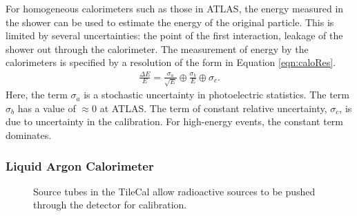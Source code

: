 For homogeneous calorimeters such as those in ATLAS, the energy measured in the shower can be used to estimate the energy of the original particle.
This is limited by several uncertainties: the point of the first interaction, leakage of the shower out through the calorimeter.
The measurement of energy by the calorimeters is specified by a resolution of the form in Equation \ref{eqn:caloRes}.
\begin{equation}\begin{split}\label{eqn:caloRes}
    \frac{\Delta E}{E}=\frac{\sigma_a}{\sqrt{E}}\oplus\frac{\sigma_b}{E}\oplus\sigma_c.
\end{split}\end{equation}
Here, the term $\sigma_a$ is a stochastic uncertainty in photoelectric statistics.
The term $\sigma_b$ has a value of $\approx0$ at ATLAS.
The term of constant relative uncertainty, $\sigma_c$, is due to uncertainty in the calibration.
For high-energy events, the constant term dominates.

\subsubsection{Liquid Argon Calorimeter}

\begin{figure}[h!]
\captionsetup[subfigure]{position=b}
\centering
{}
\caption{Source tubes in the TileCal allow radioactive sources to be pushed through the detector for calibration.}
\label{fig:atlasCalo}
\end{figure}

